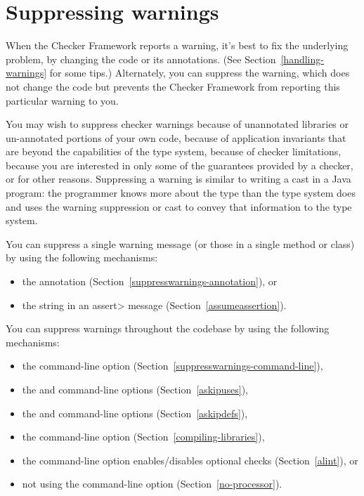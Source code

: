 \htmlhr
\chapter{Suppressing warnings\label{suppressing-warnings}}


When the Checker Framework reports a warning, it's best to fix the
underlying problem, by changing the code or its annotations.  (See
Section~\ref{handling-warnings} for some tips.)  Alternately, you can
suppress the warning, which does not change the code but prevents the
Checker Framework from reporting this particular warning to you.

You may wish to suppress checker warnings because of unannotated libraries
or un-annotated portions of your own code, because of application
invariants that are beyond the capabilities of the type system, because of
checker limitations, because you are interested in only some of the
guarantees provided by a checker, or for other reasons.
Suppressing a warning is similar to writing a cast in a Java
program:  the programmer knows more about the type than the type system does
and uses the warning suppression or cast to convey that information to the
type system.

You can suppress a single warning message (or those in a single method or
class) by using the following mechanisms:

\begin{itemize}
\item
  the  annotation
  (Section~\ref{suppresswarnings-annotation}), or
\item
  the  string in an \<assert> message (Section~\ref{assumeassertion}).
\end{itemize}

You can suppress warnings throughout the codebase by using the following mechanisms:

\begin{itemize}
\item
  the  command-line option (Section~\ref{suppresswarnings-command-line}),
\item
  the  and  command-line options (Section~\ref{askipuses}),
\item
  the  and  command-line options (Section~\ref{askipdefs}),
\item
  the  command-line
  option (Section~\ref{compiling-libraries}),
\item
  the  command-line option enables/disables optional checks (Section~\ref{alint}), or
\item
  not using the  command-line option
  (Section~\ref{no-processor}).
\end{itemize}

